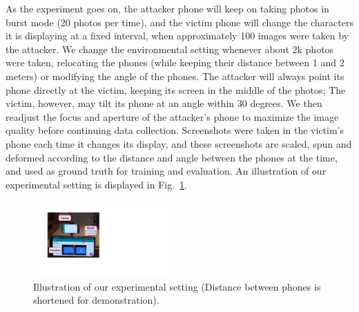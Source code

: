 As the experiment goes on, the attacker phone will keep on taking photos in burst mode (20 photos per time), and the victim phone will change the characters it is displaying at a fixed interval, when approximately 100 images were taken by the attacker. We change the environmental setting whenever about 2k photos were taken, relocating the phones (while keeping their distance between 1 and 2 meters) or modifying the angle of the phones. The attacker will always point its phone directly at the victim, keeping its screen in the middle of the photos; The victim, however, may tilt its phone at an angle within 30 degrees. We then readjust the focus and aperture of the attacker's phone to maximize the image quality before continuing data collection. Screenshots were taken in the victim's phone each time it changes its display, and these screenshots are scaled, spun and deformed according to the distance and angle between the phones at the time, and used as ground truth for training and evaluation. An illustration of our experimental setting is displayed in Fig.~\ref{illustration_of_system}.
\begin{figure}
	\centering
	\includegraphics[width=0.46\textwidth]{pic/setup.pdf}
    \caption{Illustration of our experimental setting (Distance between phones is shortened for demonstration).}
	\label{illustration_of_system}
\end{figure}

